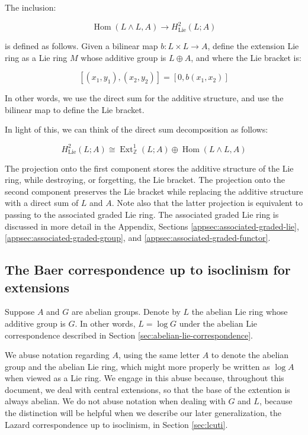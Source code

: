 The inclusion:

$$\operatorname{Hom}(L \wedge L,A) \to H^2_{\text{Lie}}(L;A)$$

is defined as follows. Given a bilinear map $b:L \times L \to A$,
define the extension Lie ring as a Lie ring $M$ whose additive group
is $L \oplus A$, and where the Lie bracket is:

$$[(x_1,y_1),(x_2,y_2)] = [0,b(x_1,x_2)]$$

In other words, we use the direct sum for the additive structure, and
use the bilinear map to define the Lie bracket.

In light of this, we can think of the direct sum decomposition as follows:

$$H^2_{\text{Lie}}(L;A) \cong \operatorname{Ext}^1_{\mathbb{Z}}(L;A) \oplus \operatorname{Hom}(L \wedge L,A)$$

The projection onto the first component stores the additive structure
of the Lie ring, while destroying, or forgetting, the Lie bracket. The
projection onto the second component preserves the Lie bracket while
replacing the additive structure with a direct sum of $L$ and
$A$. Note also that the latter projection is equivalent to passing to
the associated graded Lie ring. The associated graded Lie ring is
discussed in more detail in the Appendix, Sections
\ref{appsec:associated-graded-lie},
\ref{appsec:associated-graded-group}, and
\ref{appsec:associated-graded-functor}.

\subsection{The Baer correspondence up to isoclinism for extensions}\label{sec:bcuti-extensions}

Suppose $A$ and $G$ are abelian groups. Denote by $L$ the abelian Lie
ring whose additive group is $G$. In other words, $L = \log G$ under
the abelian Lie correspondence described in Section
\ref{sec:abelian-lie-correspondence}.

We abuse notation regarding $A$, using the same letter $A$ to denote
the abelian group and the abelian Lie ring, which might more properly
be written as $\log A$ when viewed as a Lie ring. We engage in this
abuse because, throughout this document, we deal with central
extensions, so that the base of the extention is always abelian. We do
not abuse notation when dealing with $G$ and $L$, because the
distinction will be helpful when we describe our later generalization,
the Lazard correspondence up to isoclinism, in Section
\ref{sec:lcuti}.

